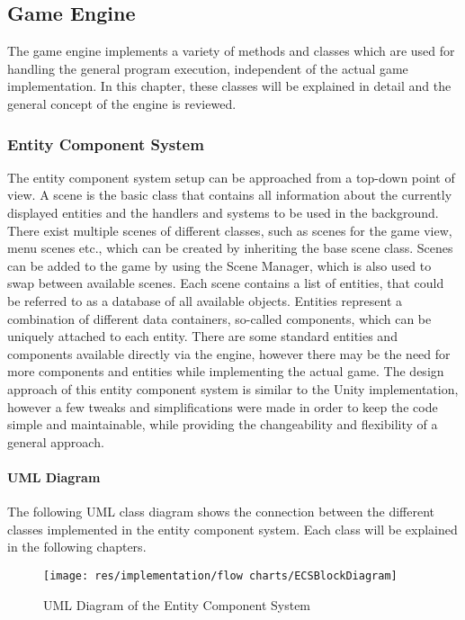 \subsection{Game Engine}\label{subsec:game}
The game engine implements a variety of methods and classes which are used for handling the general program execution, independent of the actual game implementation.
In this chapter, these classes will be explained in detail and the general concept of the engine is reviewed.

\subsubsection{Entity Component System}\label{subsubsec:entity-component-system-implementation}
The entity component system setup can be approached from a top-down point of view.
A scene is the basic class that contains all information about the currently displayed entities and the handlers and systems to be used
in the background.
There exist multiple scenes of different classes, such as scenes for the game view, menu scenes etc., which can be created by
inheriting the base scene class.
Scenes can be added to the game by using the Scene Manager, which is also used to swap between available scenes.
Each scene contains a list of entities, that could be referred to as a database of all available objects.
Entities represent a combination of different data containers, so-called components, which can be uniquely attached to each entity.
There are some standard entities and components available directly via the engine, however there may be the need for more components and entities while implementing the actual game.
The design approach of this entity component system is similar to the Unity implementation, however a few tweaks and simplifications were made in order to keep the code
simple and maintainable, while providing the changeability and flexibility of a general approach.
\paragraph{UML Diagram}
The following UML class diagram shows the connection between the different classes implemented in the entity component system.
Each class will be explained in the following chapters.
\begin{figure}
    \centering
    \texttt{[image: res/implementation/flow charts/ECSBlockDiagram]}
    \caption{UML Diagram of the Entity Component System}
    \label{fig:ecs-block-diagram}
\end{figure}

